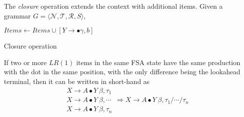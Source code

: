 \begin{definition}
    The \textit{closure} operation extends the context with additional items. Given a grammar $G = \langle \mathcal{N}, \mathcal{T}, \mathcal{R}, S \rangle$,
    
    \begin{algorithm}[H]
        \begin{algorithmic}[1]
                \Repeat
                                \State $Items \gets Items \cup [Y \to \bullet \gamma, b]$
                            \EndFor
                        \EndFor
                    \EndFor
            \EndProcedure
        \end{algorithmic}
        \caption{Closure operation}
        \label{prog:closure-lr1}
    \end{algorithm}
\end{definition}

\begin{remark}
    If two or more $LR(1)$ items in the same FSA state have the same production with the dot in the same position, with the only difference being the lookahead terminal, then it can be written in short-hand as
    \begin{equation}
        \boxed{\begin{gathered}
            X \to A \bullet Y\ \beta, \tau_1 \\
            X \to A \bullet Y\ \beta, \cdots \\
            X \to A \bullet Y\ \beta, \tau_n 
        \end{gathered}} \Rightarrow
        \boxed{
            X \to A \bullet Y\ \beta, \tau_1 / \cdots / \tau_n
        }
    \end{equation}
\end{remark}


